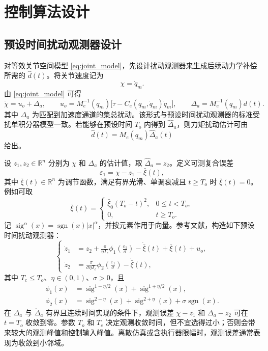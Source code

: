 \section{控制算法设计}

\subsection{预设时间扰动观测器设计}

对等效关节空间模型 \eqref{eq:joint_model}，先设计扰动观测器来生成后续动力学补偿所需的 \(\hat d(t)\)。将关节速度记为
\[
\chi=\dot q_m .
\]
由 \eqref{eq:joint_model} 可得
\begin{equation}
\dot\chi=u_o+\Delta_a,
\qquad
u_o=M_e^{-1}(q_m)\bigl[\tau-C_e(q_m,\dot q_m)\dot q_m\bigr],
\qquad
\Delta_a=M_e^{-1}(q_m)d(t).
\label{eq:observer_channel}
\end{equation}
其中 \(\Delta_a\) 为匹配到加速度通道的集总扰动。该形式与预设时间扰动观测器的标准受扰单积分器模型一致\cite{jiangPrescribedtimeDisturbanceObserver2024}。若能够在预设时间 \(T_o\) 内得到 \(\hat\Delta_a\)，则力矩扰动估计可由
\begin{equation}
\hat d(t)=M_e(q_m)\hat\Delta_a(t)
\label{eq:dhat_from_observer}
\end{equation}
给出。

设 \(z_1,z_2\in\mathbb R^n\) 分别为 \(\chi\) 和 \(\Delta_a\) 的估计值，取 \(\hat\Delta_a=z_2\)。定义可测复合误差
\[
\varepsilon_1=\chi-z_1-\bar\xi(t),
\]
其中 \(\bar\xi(t)\in\mathbb R^n\) 为调节函数，满足有界光滑、单调衰减且 \(t\ge T_o\) 时 \(\bar\xi(t)=0\)。例如可取
\[
\bar\xi(t)=
\begin{cases}
\bar\xi_0(T_o-t)^2, & 0\le t<T_o,\\
0, & t\ge T_o.
\end{cases}
\]
记 \(\operatorname{sig}^{\alpha}(x)=\operatorname{sgn}(x)|x|^\alpha\)，并按元素作用于向量。参考文献\cite{jiangPrescribedtimeDisturbanceObserver2024}，构造如下预设时间扰动观测器：
\begin{equation}
\left\{
\begin{aligned}
\dot z_1
&=z_2+\frac{\pi}{\eta T_c}
\phi_1\left(\frac{\varepsilon_1}{\sigma}\right)
-\dot{\bar\xi}(t)+\bar\xi(t)+u_o,\\
\dot z_2
&=\frac{\pi}{\sigma\eta T_c}
\phi_2\left(\frac{\varepsilon_1}{\sigma}\right)
-\dot{\bar\xi}(t),
\end{aligned}
\right.
\label{eq:ptdo}
\end{equation}
其中 \(T_c\le T_o\)、\(\eta\in(0,1)\)、\(\sigma>0\)，且
\[
\begin{aligned}
\phi_1(x)&=\operatorname{sig}^{1-\eta/2}(x)+\operatorname{sig}^{1+\eta/2}(x),\\
\phi_2(x)&=\operatorname{sig}^{2-\eta}(x)+\operatorname{sig}^{2+\eta}(x)+\sigma\operatorname{sgn}(x).
\end{aligned}
\]
在 \(\Delta_a\) 与 \(\dot\Delta_a\) 有界且连续时间实现的条件下，观测误差 \(\chi-z_1\) 和 \(\Delta_a-z_2\) 可在 \(t=T_o\) 收敛到零。参数 \(T_o\) 和 \(T_c\) 决定观测收敛时间，但不宜选得过小；否则会带来较大的观测峰值和控制输入峰值。离散仿真或含执行器限幅时，观测误差通常表现为收敛到小邻域。


